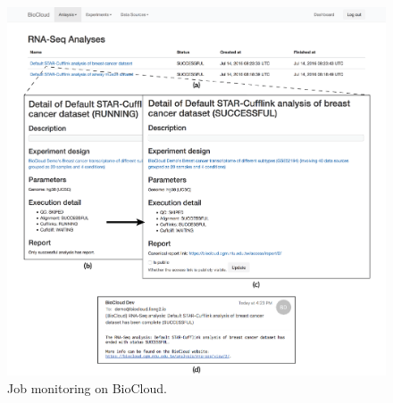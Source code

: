\begin{figure}[!p]
\centering
\includegraphics[width=1\textwidth]{images/biocloud_job_monitor}
\caption[Job monitoring on BioCloud]{
    Job monitoring on BioCloud.
}
\label{fig:biocloud-job-monitor}
\end{figure}

